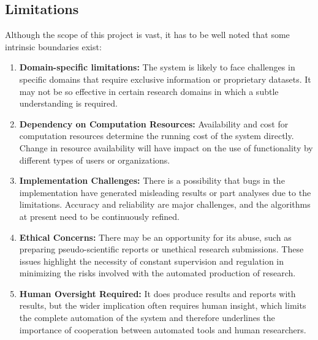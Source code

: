 \subsection{Limitations }
Although the scope of this project is vast, it has to be well noted that some intrinsic boundaries exist:
\begin{enumerate}
    \item \textbf{Domain-specific limitations:} The system is likely to face challenges in specific domains that require exclusive information or proprietary datasets. It may not be so effective in certain research domains in which a subtle understanding is required.
    
    \item \textbf{Dependency on Computation Resources:} Availability and cost for computation resources determine the running cost of the system directly. Change in resource availability will have impact on the use of functionality by different types of users or organizations.
    
    \item \textbf{Implementation Challenges:} There is a possibility that bugs in the implementation have generated misleading results or part analyses due to the limitations. Accuracy and reliability are major challenges, and the algorithms at present need to be continuously refined.
    
    \item \textbf{Ethical Concerns:} There may be an opportunity for its abuse, such as preparing pseudo-scientific reports or unethical research submissions. These issues highlight the necessity of constant supervision and regulation in minimizing the risks involved with the automated production of research.
    
    \item \textbf{Human Oversight Required:} It does produce results and reports with results, but the wider implication often requires human insight, which limits the complete automation of the system and therefore underlines the importance of cooperation between automated tools and human researchers.
    

\end{enumerate}
